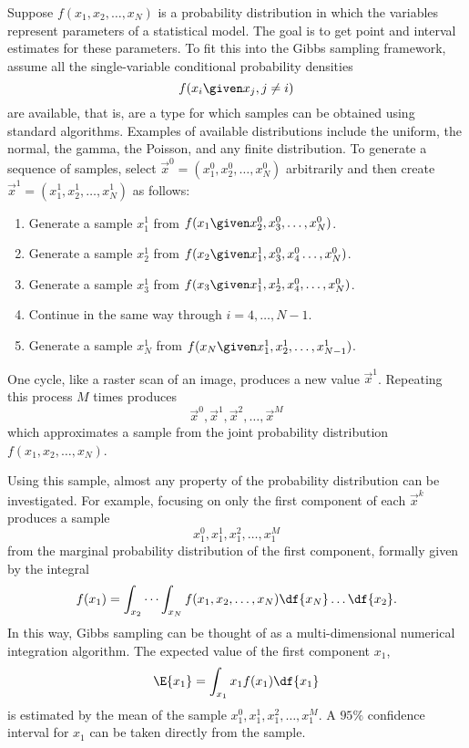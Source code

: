 \documentclass[12pt]{article}
\begin{document}
Suppose \( f(x_1, x_2, \dots, x_N) \) is a probability distribution in
which the variables represent parameters of a statistical model.  The
goal is to get point and interval estimates for these parameters.  To
fit this into the Gibbs sampling framework, assume all the
single-variable conditional probability densities
\[
    f(x_i \given x_j, j \ne i)
\] are available, that is, are a type for which samples can be obtained
using standard algorithms.  Examples of available distributions include
the uniform, the normal, the gamma, the Poisson, and any finite
distribution.  To generate a sequence of samples, select \(
\overrightarrow{x}^0 = (x_1^0, x_2^0, \dots, x_N^0) \) arbitrarily and
then create \( \overrightarrow{x}^1 = (x_1^1, x_2^1, \dots, x_N^1) \) as
follows:
\begin{enumerate}
    \item
        Generate a sample \( x_1^1 \) from \( f(x_1 \given x_2^0, x_3^0,
        \dots, x_N^0) \).
    \item
        Generate a sample \( x_2^1 \) from \( f(x_2 \given x_1^1, x_3^0,x_4^
        {0} \dots, x_N^0) \).
    \item
        Generate a sample \( x_3^1 \) from \( f(x_3 \given x_1^1, x_2^1,
        x_4^0, \dots, x_N^0) \).
    \item
        Continue in the same way through \( i = 4, \dots, N-1 \).
    \item
        Generate a sample \( x_N^1 \) from \( f(x_N \given x_1^1, x_2^1,
        \dots, x_{N-1}^1) \).
\end{enumerate}
One cycle, like a raster scan of an image, produces a new value \(
\overrightarrow{x}^1 \).  Repeating this process \( M \) times produces
\[
    \overrightarrow{x}^0, \overrightarrow{x}^1, \overrightarrow{x}^2,
    \dots, \overrightarrow{x}^M
\] which approximates a sample from the joint probability distribution \(
f(x_1, x_2, \dots, x_N) \).

Using this sample, almost any property of the probability distribution
can be investigated.  For example, focusing on only the first component
of each \( \overrightarrow{x}^k \) produces a sample
\[
    x_1^0, x_1^1, x_1^2,\dots, x_1^M
\] from the marginal probability distribution of the first component,
formally given by the integral
\[
    f(x_1) = \int_{x_2}\cdots \int_{x_N} f(x_1, x_2, \dots, x_N) \df{x_N}
    \dots \df{x_2}.
\] In this way, Gibbs sampling can be thought of as a multi-dimensional
numerical integration algorithm.  The expected value of the first
component \( x_1 \),
\[
    \E{x_1} = \int_{x_1} x_1 f(x_1) \df{x_1}
\] is estimated by the mean of the sample \( x_1^0, x_1^1, x_1^2,\dots,
x_1^M \).  A \( 95\% \) confidence interval for \( x_1 \) can be taken
directly from the sample.
\end{document}
